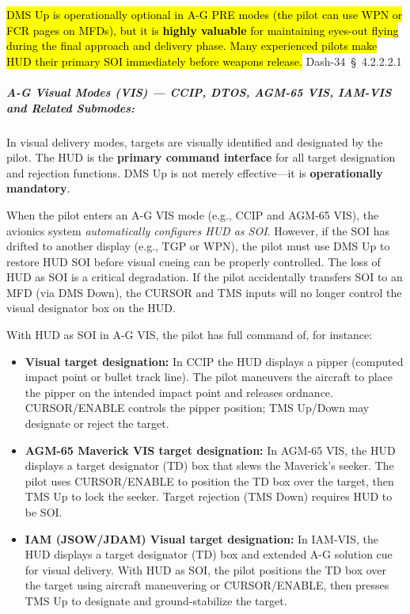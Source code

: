 \documentclass[11pt,a4paper]{article}
\providecommand{\dashref}[1]{Dash-34~\S~#1}
\begin{document}
\hl{DMS Up is operationally optional in A-G PRE modes (the pilot can use WPN or FCR pages on MFDs), but it is \textbf{highly valuable} for maintaining eyes-out flying during the final approach and delivery phase. Many experienced pilots make HUD their primary SOI immediately before weapons release.} \dashref{4.2.2.2.1}

\subparagraph*{A-G Visual Modes (VIS) --- CCIP, DTOS, AGM-65 VIS, IAM-VIS and Related Submodes:}

In visual delivery modes, targets are visually identified and designated by the pilot. The HUD is the \textbf{primary command interface} for all target designation and rejection functions. DMS Up is not merely effective---it is \textbf{operationally mandatory}.

When the pilot enters an A-G VIS mode (e.g., CCIP and AGM-65 VIS), the avionics system \textit{automatically configures HUD as SOI}. However, if the SOI has drifted to another display (e.g., TGP or WPN), the pilot must use DMS Up to restore HUD SOI before visual cueing can be properly controlled. The loss of HUD as SOI is a critical degradation. If the pilot accidentally transfers SOI to an MFD (via DMS Down), the CURSOR and TMS inputs will no longer control the visual designator box on the HUD.

With HUD as SOI in A-G VIS, the pilot has full command of, for instance:

\begin{itemize}

\item \textbf{Visual target designation:} In CCIP the HUD displays a pipper (computed impact point or bullet track line). The pilot maneuvers the aircraft to place the pipper on the intended impact point and releases ordnance. CURSOR/ENABLE controls the pipper position; TMS Up/Down may designate or reject the target.

\item \textbf{AGM-65 Maverick VIS target designation:} In AGM-65 VIS, the HUD displays a target designator (TD) box that slews the Maverick's seeker. The pilot uses CURSOR/ENABLE to position the TD box over the target, then TMS Up to lock the seeker. Target rejection (TMS Down) requires HUD to be SOI.

\item \textbf{IAM (JSOW/JDAM) Visual target designation:}  In IAM-VIS, the HUD displays a target designator (TD) box and extended A-G solution cue for visual delivery. With HUD as SOI, the pilot positions the TD box over the target using aircraft maneuvering or CURSOR/ENABLE, then presses TMS Up to designate and ground-stabilize the target.

\end{itemize}
\end{document}
